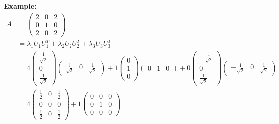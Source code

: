 \noindent
\newline
\textbf{Example:}
\begin{align}
    A &= \begin{pmatrix}
        2 & 0 & 2 \\
        0 & 1 & 0 \\
        2 & 0 & 2
    \end{pmatrix} \\
    &= \lambda_1 U_1 U_1^T + \lambda_2 U_2 U_2^T + \lambda_3 U_3 U_3^T \\
    &= 4 \begin{pmatrix}
        \frac{1}{\sqrt{2}} \\ 0 \\ \frac{1}{\sqrt{2}}
    \end{pmatrix} \begin{pmatrix}
        \frac{1}{\sqrt{2}} & 0 & \frac{1}{\sqrt{2}}
    \end{pmatrix} + 1 \begin{pmatrix}
        0 \\ 1 \\ 0 
    \end{pmatrix} \begin{pmatrix}
        0 & 1 & 0 
    \end{pmatrix} + 0 \begin{pmatrix}
        -\frac{1}{\sqrt{2}} \\ 0 \\ \frac{1}{\sqrt{2}}
    \end{pmatrix} \begin{pmatrix}
        -\frac{1}{\sqrt{2}} & 0 & \frac{1}{\sqrt{2}}
    \end{pmatrix} \\
    &= 4 \begin{pmatrix}
        \frac{1}{2} & 0 & \frac{1}{2} \\
        0 & 0 & 0 \\
        \frac{1}{2} & 0 & \frac{1}{2}
    \end{pmatrix} + 1 \begin{pmatrix}
        0 & 0 & 0 \\
        0 & 1 & 0 \\
        0 & 0 & 0
    \end{pmatrix}
\end{align}
